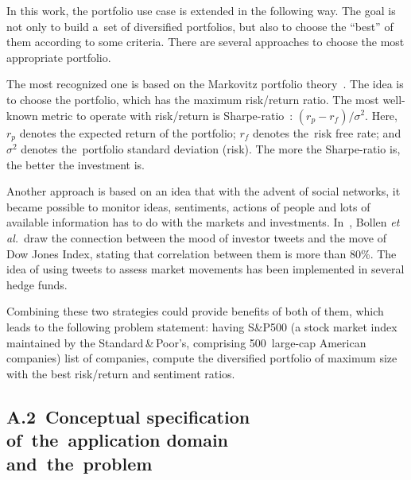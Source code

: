 \begin{multicols}{2}
{In this work, the portfolio use case is extended in the following way. The goal is
not only to build a~set of diversified portfolios, but
also to choose the ``best'' of them
according to some criteria. There are several approaches to choose the most
appropriate portfolio.

  The most recognized one is based on the Markovitz portfolio theory~\cite{10-kal}.
The idea is to choose the portfolio, which has the maximum risk/return ratio. The
most well-known metric to operate with risk/return is Sharpe-ratio~\cite{11-kal}:
  $(r_p -r_f)/\sigma^2$. Here, $r_p$ denotes the expected return of the portfolio;
$r_f$ denotes the~risk free rate; and $\sigma^2$ denotes the~portfolio standard deviation (risk).
The more the Sharpe-ratio is, the better the investment is.

  Another approach is based on an idea that with the advent of social networks, it
became possible to monitor ideas, sentiments, actions of people and lots of available
information has to do with the markets and investments. In~\cite{12-kal}, Bollen
\textit{et al.}\ draw the connection between the mood of investor tweets and the move
of Dow Jones Index, stating that correlation between them is more than 80\%. The
idea of using tweets to assess market movements has been implemented in several
hedge funds.

  Combining these two strategies could provide benefits of both of them, which
leads to the following problem statement: having S\&P500 (a stock market index
maintained by the Standard\,\&\,Poor's, comprising 500~large-cap American
companies) list of companies, compute the diversified portfolio of maximum size
with the best risk/return and sentiment ratios.


\subsection*{A.2\	Conceptual specification\\
\hspace*{20pt}of~the~application domain\\
\hspace*{20pt}and~the~problem}


}
\end{multicols}
